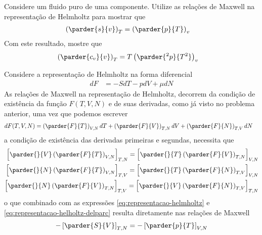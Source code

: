 \begin{prob}
	Considere um fluido puro de uma componente. Utilize as relações de Maxwell na representação
de Helmholtz para mostrar que
\begin{align}
	\label{eq:relacao-prob6.1}
	\left(\parder{s}{v}\right)_T&=\left(\parder{p}{T}\right)_v
\end{align}
Com este resultado, mostre que
\begin{align}
	\label{eq:relacao-prob6.2}
	\left(\parder{c_v}{v}\right)_T&=T\left(\parder{^2p}{T^2}\right)_v
\end{align}
\begin{sol}
	Considere a representação de Helmholtz na forma diferencial
	\begin{align}
		\label{eq:representacao-helmholtz}
		dF&=-SdT-pdV+\mu dN
	\end{align}
	As relações de Maxwell na representação de Helmholtz, decorrem da condição de existência da função $F(T,V,N)$ e de suas derivadas, como já visto no problema anterior, uma vez que podemos escrever
	\begin{align}
		\label{eq:representacao-helholtz-delparc}
		dF(T,V,N)&=\left(\parder{F}{T}\right)_{V,N}dT+\left(\parder{F}{V}\right)_{T,N}dV+\left(\parder{F}{N}\right)_{T,V}dN
	\end{align}
	a condição de existência das derivadas primeiras e segundas, necessita que
	\begin{subequations}
		\begin{align}
			\left[\parder{}{V}\left(\parder{F}{T}\right)_{V,N}\right]_{T,N}=\left[\parder{}{T}\left(\parder{F}{V}\right)_{T,N}\right]_{V,N}\label{eq:d2fdvdt=d2fdtdv}\\
			\left[\parder{}{N}\left(\parder{F}{T}\right)_{V,N}\right]_{T,V}=\left[\parder{}{T}\left(\parder{F}{N}\right)_{T,V}\right]_{V,N}\label{eq:d2fdndt=d2fdtdn}\\
			\left[\parder{}{N}\left(\parder{F}{V}\right)_{T,N}\right]_{T,V}=\left[\parder{}{V}\left(\parder{F}{N}\right)_{T,V}\right]_{T,N}\label{eq:d2fdndv=d2fdvdn}
		\end{align}
	\end{subequations}
	o que combinado com as expressões \eqref{eq:representacao-helmholtz} e \eqref{eq:representacao-helholtz-delparc} resulta diretamente nas relações de Maxwell	
	\begin{subequations}
		\begin{align}
			-\left[\parder{S}{V}\right]_{T,N}&=-\left[\parder{p}{T}\right]_{V,N}\label{eq:maxwell-helmholtz-ps}\\

\end{align}
\end{subequations}
\end{sol}
\end{prob}
